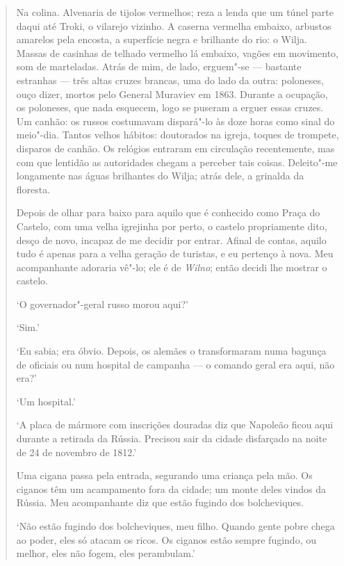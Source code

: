 \begin{quote}
Na colina. Alvenaria de tijolos vermelhos; reza a lenda que um túnel
parte daqui até Troki, o vilarejo vizinho. A caserna vermelha embaixo,
arbustos amarelos pela encosta, a superfície negra e brilhante do rio: o
Wilja. Massas de casinhas de telhado vermelho lá embaixo, vagões em
movimento, som de marteladas. Atrás de mim, de lado, erguem"-se ---
bastante estranhas --- três altas cruzes brancas, uma do lado da outra:
poloneses, ouço dizer, mortos pelo General Muraviev em 1863. Durante a
ocupação, os poloneses, que nada esquecem, logo se puseram a erguer
essas cruzes. Um canhão: os russos costumavam dispará"-lo às doze horas
como sinal do meio"-dia. Tantos velhos hábitos: doutorados na igreja,
toques de trompete, disparos de canhão. Os relógios entraram em
circulação recentemente, mas com que lentidão as autoridades chegam a
perceber tais coisas. Deleito"-me longamente nas águas brilhantes do
Wilja; atrás dele, a grinalda da floresta.

Depois de olhar para baixo para aquilo que é conhecido como Praça do
Castelo, com uma velha igrejinha por perto, o castelo propriamente dito,
desço de novo, incapaz de me decidir por entrar. Afinal de contas,
aquilo tudo é apenas para a velha geração de turistas, e eu pertenço à
nova. Meu acompanhante adoraria vê"-lo; ele é de \textit{Wilno}; então decidi lhe
mostrar o castelo.

`O governador"-geral russo morou aqui?'

`Sim.'

`Eu sabia; era óbvio. Depois, os alemães o transformaram numa bagunça de
oficiais ou num hospital de campanha --- o comando geral era aqui, não
era?'

`Um hospital.'

`A placa de mármore com inscrições douradas diz que Napoleão ficou aqui
durante a retirada da Rússia. Precisou sair da cidade disfarçado na
noite de 24 de novembro de 1812.'

Uma cigana passa pela entrada, segurando uma criança pela mão. Os
ciganos têm um acampamento fora da cidade; um monte deles vindos da
Rússia. Meu acompanhante diz que estão fugindo dos bolcheviques.

`Não estão fugindo dos bolcheviques, meu filho. Quando gente pobre chega
ao poder, eles só atacam os ricos. Os ciganos estão sempre fugindo, ou
melhor, eles não fogem, eles perambulam.'


\end{quote}
